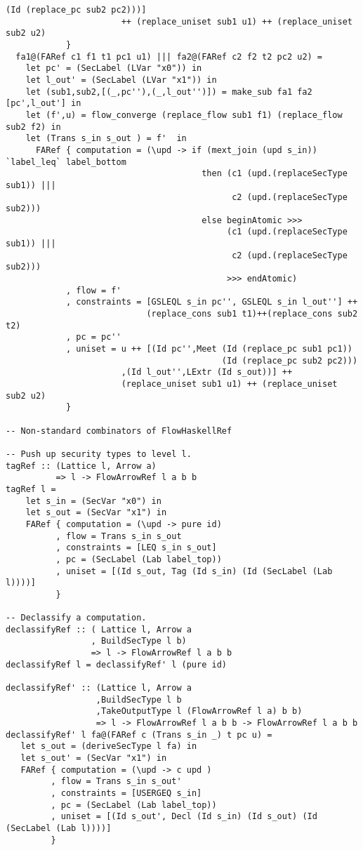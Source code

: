 \begin{Verbatim}[fontsize=\footnotesize,frame=lines,
                 framesep=5mm, label={[FlowArrowRef.hs]FlowArrowRef.hs}]
                                      (Id (replace_pc sub2 pc2)))]
                       ++ (replace_uniset sub1 u1) ++ (replace_uniset sub2 u2)
            }
  fa1@(FARef c1 f1 t1 pc1 u1) ||| fa2@(FARef c2 f2 t2 pc2 u2) =
    let pc' = (SecLabel (LVar "x0")) in
    let l_out' = (SecLabel (LVar "x1")) in
    let (sub1,sub2,[(_,pc''),(_,l_out'')]) = make_sub fa1 fa2 [pc',l_out'] in
    let (f',u) = flow_converge (replace_flow sub1 f1) (replace_flow sub2 f2) in
    let (Trans s_in s_out ) = f'  in
      FARef { computation = (\upd -> if (mext_join (upd s_in)) `label_leq` label_bottom
                                       then (c1 (upd.(replaceSecType sub1)) ||| 
                                             c2 (upd.(replaceSecType sub2)))
                                       else beginAtomic >>> 
                                            (c1 (upd.(replaceSecType sub1)) ||| 
                                             c2 (upd.(replaceSecType sub2))) 
                                            >>> endAtomic)
	        , flow = f'
            , constraints = [GSLEQL s_in pc'', GSLEQL s_in l_out''] ++ 
                            (replace_cons sub1 t1)++(replace_cons sub2 t2)
            , pc = pc''
            , uniset = u ++ [(Id pc'',Meet (Id (replace_pc sub1 pc1)) 
                                           (Id (replace_pc sub2 pc2)))
                       ,(Id l_out'',LExtr (Id s_out))] ++ 
                       (replace_uniset sub1 u1) ++ (replace_uniset sub2 u2)
            }

-- Non-standard combinators of FlowHaskellRef

-- Push up security types to level l. 
tagRef :: (Lattice l, Arrow a) 
          => l -> FlowArrowRef l a b b
tagRef l = 
    let s_in = (SecVar "x0") in
    let s_out = (SecVar "x1") in
    FARef { computation = (\upd -> pure id)
          , flow = Trans s_in s_out
          , constraints = [LEQ s_in s_out]
          , pc = (SecLabel (Lab label_top)) 
          , uniset = [(Id s_out, Tag (Id s_in) (Id (SecLabel (Lab l))))]
          }

-- Declassify a computation.
declassifyRef :: ( Lattice l, Arrow a
                 , BuildSecType l b)
                 => l -> FlowArrowRef l a b b
declassifyRef l = declassifyRef' l (pure id)

declassifyRef' :: (Lattice l, Arrow a
                  ,BuildSecType l b
                  ,TakeOutputType l (FlowArrowRef l a) b b) 
                  => l -> FlowArrowRef l a b b -> FlowArrowRef l a b b
declassifyRef' l fa@(FARef c (Trans s_in _) t pc u) =
   let s_out = (deriveSecType l fa) in
   let s_out' = (SecVar "x1") in
   FARef { computation = (\upd -> c upd )
         , flow = Trans s_in s_out'
         , constraints = [USERGEQ s_in]
         , pc = (SecLabel (Lab label_top))
         , uniset = [(Id s_out', Decl (Id s_in) (Id s_out) (Id (SecLabel (Lab l))))]
         }


\end{Verbatim}
